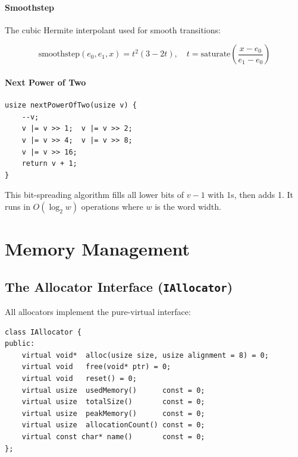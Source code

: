 \documentclass[12pt, a4paper]{report}
\theoremstyle{definition}
\theoremstyle{remark}
\begin{document}
\subsubsection{Smoothstep}

The cubic Hermite interpolant used for smooth transitions:

\begin{equation}
\text{smoothstep}(e_0, e_1, x)
= t^2(3 - 2t), \quad t = \text{saturate}\!\left(\frac{x - e_0}{e_1 - e_0}\right)
\end{equation}

\subsubsection{Next Power of Two}

\begin{lstlisting}[caption={Bit-manipulation power-of-two rounding}]
usize nextPowerOfTwo(usize v) {
    --v;
    v |= v >> 1;  v |= v >> 2;
    v |= v >> 4;  v |= v >> 8;
    v |= v >> 16;
    return v + 1;
}
\end{lstlisting}

This bit-spreading algorithm fills all lower bits of $v-1$ with 1s,
then adds 1. It runs in $O(\log_2 w)$ operations where $w$ is the word width.

\chapter{Memory Management}

\section{The Allocator Interface (\texttt{IAllocator})}

All allocators implement the pure-virtual interface:

\begin{lstlisting}[caption={IAllocator interface}]
class IAllocator {
public:
    virtual void*  alloc(usize size, usize alignment = 8) = 0;
    virtual void   free(void* ptr) = 0;
    virtual void   reset() = 0;
    virtual usize  usedMemory()      const = 0;
    virtual usize  totalSize()       const = 0;
    virtual usize  peakMemory()      const = 0;
    virtual usize  allocationCount() const = 0;
    virtual const char* name()       const = 0;
};
\end{lstlisting}
\end{document}
